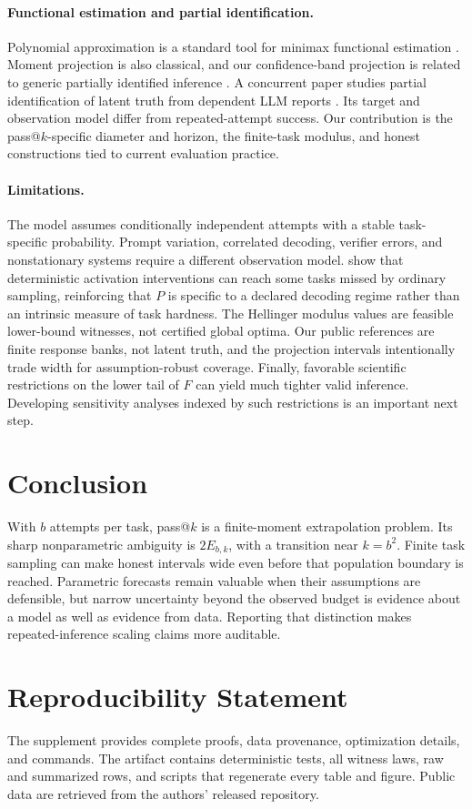 \documentclass[twoside]{article}
\begin{document}
\paragraph{Functional estimation and partial identification.}
Polynomial approximation is a standard tool for minimax functional estimation \citep{jiao2015}. Moment projection is also classical, and our confidence-band projection is related to generic partially identified inference \citep{kaido2019}. A concurrent paper studies partial identification of latent truth from dependent LLM reports \citep{chen2026}. Its target and observation model differ from repeated-attempt success. Our contribution is the pass@\(k\)-specific diameter and horizon, the finite-task modulus, and honest constructions tied to current evaluation practice.

\paragraph{Limitations.}
The model assumes conditionally independent attempts with a stable task-specific probability. Prompt variation, correlated decoding, verifier errors, and nonstationary systems require a different observation model. \citet{zhou2026} show that deterministic activation interventions can reach some tasks missed by ordinary sampling, reinforcing that \(P\) is specific to a declared decoding regime rather than an intrinsic measure of task hardness. The Hellinger modulus values are feasible lower-bound witnesses, not certified global optima. Our public references are finite response banks, not latent truth, and the projection intervals intentionally trade width for assumption-robust coverage. Finally, favorable scientific restrictions on the lower tail of \(F\) can yield much tighter valid inference. Developing sensitivity analyses indexed by such restrictions is an important next step.

\section{Conclusion}

With \(b\) attempts per task, pass@\(k\) is a finite-moment extrapolation problem. Its sharp nonparametric ambiguity is \(2E_{b,k}\), with a transition near \(k=b^2\). Finite task sampling can make honest intervals wide even before that population boundary is reached. Parametric forecasts remain valuable when their assumptions are defensible, but narrow uncertainty beyond the observed budget is evidence about a model as well as evidence from data. Reporting that distinction makes repeated-inference scaling claims more auditable.

\section*{Reproducibility Statement}

The supplement provides complete proofs, data provenance, optimization details, and commands. The artifact contains deterministic tests, all witness laws, raw and summarized rows, and scripts that regenerate every table and figure. Public data are retrieved from the authors' released repository.

\balance

\end{document}
